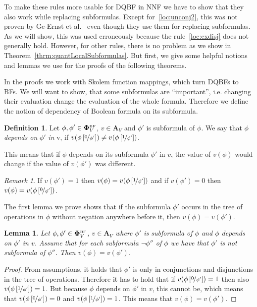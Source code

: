 \documentclass[
  digital, %
  color,
  twoside, %
  table,   %
  nolof,     %
  nolot,     %
]{fithesis3}
\newtheorem{lemma}[theorem]{Lemma}         %
\theoremstyle{definition}
\newtheorem{definition}{Definition}
\theoremstyle{remark}
\newtheorem*{remark}{Remark}
\newcommand{\substitute}[2]{\left[ \nicefrac{#2}{#1} \right]}
\newcommand{\BF}[1]{\mathbf{\Phi}_{#1}^{\normalfont{\text{\tiny BF}}}}
\newcommand{\valtns}[1]{\mathbf{A}_{#1}}
\begin{document}
To make these rules more usable for DQBF in NNF we have to show that they also work while replacing subformulas. Except for~\eqref{loc:unconj2}, this was not proven by Ge-Ernst et al.~\cite{HQSquantifierLocalisation} even though they use them for replacing subformulas. As we will show, this was used erroneously because the rule~\eqref{loc:exdisj} does not generally hold. However, for other rules, there is no problem as we show in Theorem~\ref{thrm:quantLocalSubformulas}. But first, we give some helpful notions and lemmas we use for the proofs of the following theorems.

In the proofs we work with Skolem function mappings, which turn DQBFs to BFs. We will want to show, that some subformulas are ``important'', i.e. changing their evaluation change the evaluation of the whole formula. Therefore we define the notion of dependency of Boolean formula on its subformula.
\begin{definition}
  Let $\phi, \phi' \in \BF{V}$, $v \in \valtns{V}$ and $\phi'$ is subformula of $\phi$. We say that $\phi$ \emph{depends on} $\phi'$ \emph{in} v, if $v(\phi\substitute{\phi'}{0}) \not= v(\phi\substitute{\phi'}{1})$.
\end{definition}
This means that if $\phi$ depends on its subformula $\phi'$ in $v$, the value of $v(\phi)$ would change if the value of $v(\phi')$ was different.

\begin{remark}
  If $v(\phi') = 1$ then $v(\phi) = v(\phi\substitute{\phi'}{1})$ and if $v(\phi') = 0$ then $v(\phi) = v(\phi\substitute{\phi'}{0})$.
\end{remark}

The first lemma we prove shows that if the subformula $\phi'$ occurs in the tree of operations in $\phi$ without negation anywhere before it, then $v(\phi) = v(\phi')$.
\begin{lemma}
  \label{lemma:nonegdepends}
  Let $\phi, \phi' \in \BF{V}$, $v \in \valtns{V}$ where $\phi'$ is subformula of $\phi$ and $\phi$ depends on $\phi'$ in $v$. Assume that for each subformula $\neg \phi''$ of $\phi$ we have that $\phi'$ is not subformula of $\phi''$. Then $v(\phi) = v(\phi')$.
\end{lemma}
\begin{proof}
  From assumptions, it holds that $\phi'$ is only in conjunctions and disjunctions in the tree of operations. Therefore it has to hold that if $v(\phi\substitute{\phi'}{0}) = 1$ then also $v(\phi\substitute{\phi'}{1}) = 1$. But because $\phi$ depends on $\phi'$ in $v$, this cannot be, which means that $v(\phi\substitute{\phi'}{0}) = 0$ and $v(\phi\substitute{\phi'}{1}) = 1$. This means that $v(\phi) = v(\phi')$.
\end{proof}
\end{document}
